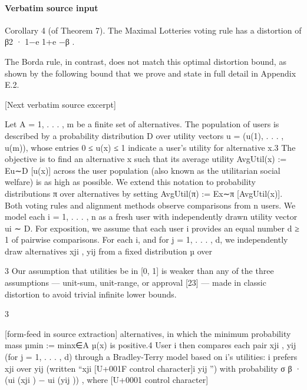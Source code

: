 \documentclass[10pt]{article}
\begin{document}
\paragraph{Verbatim source input}
\begin{ReviewVerbatim}
Corollary 4 (of Theorem 7). The Maximal Lotteries voting rule has a distortion of β2 · 1−e
                                                                                         1+e
                                                                                             −β .

The Borda rule, in contrast, does not match this optimal distortion bound, as shown by the following
bound that we prove and state in full detail in Appendix E.2.

[Next verbatim source excerpt]

Let A = {1, . . . , m} be a finite set of alternatives. The population of users is described by a
probability distribution D over utility vectors u = (u(1), . . . , u(m)), whose entries 0 ≤ u(x) ≤ 1
indicate a user’s utility for alternative x.3 The objective is to find an alternative x such that its average
utility AvgUtil(x) := Eu∼D [u(x)] across the user population (also known as the utilitarian social
welfare) is as high as possible. We extend this notation to probability distributions π over alternatives
by setting AvgUtil(π) := Ex∼π [AvgUtil(x)].
Both voting rules and alignment methods observe comparisons from n users. We model each
i = 1, . . . , n as a fresh user with independently drawn utility vector ui ∼ D. For exposition, we
assume that each user i provides an equal number d ≥ 1 of pairwise comparisons. For each i,
and for j = 1, . . . , d, we independently draw alternatives xji , yij from a fixed distribution µ over

    3
     Our assumption that utilities be in [0, 1] is weaker than any of the three assumptions — unit-sum, unit-range,
or approval [23] — made in classic distortion to avoid trivial infinite lower bounds.


                                                           3

[form-feed in source extraction]
alternatives, in which the minimum probability mass µmin := minx∈A µ(x) is positive.4 User i
then compares each pair {xji , yij } (for j = 1, . . . , d) through a Bradley-Terry model based on i’s
utilities: i prefers xji over yij (written “xji [U+001F control character]i yij ”) with probability σ β · (ui (xji ) − ui (yij )) , where
                                                                                                        [U+0001 control character]


\end{ReviewVerbatim}
\end{document}

